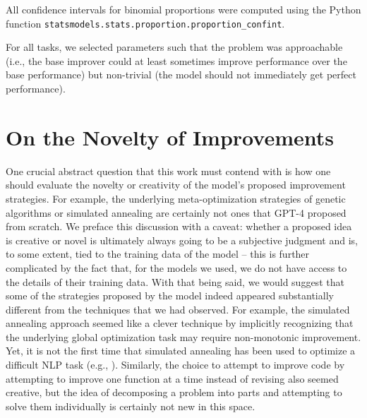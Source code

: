 \documentclass{article}
\begin{document}
All \citet{wilson1927probable} confidence intervals for binomial proportions were computed using the Python function \lstinline[language=Python]{statsmodels.stats.proportion.proportion_confint}.

For all tasks, we selected parameters such that the problem was approachable (i.e., the base improver could at least sometimes improve performance over the base performance) but non-trivial (the model should not immediately get perfect performance).

\section{On the Novelty of Improvements}
One crucial abstract question that this work must contend with is how one should evaluate the novelty or creativity of the model's proposed improvement strategies. For example, the underlying meta-optimization strategies of genetic algorithms or simulated annealing are certainly not ones that GPT-4 proposed from scratch. We preface this discussion with a caveat: whether a proposed idea is creative or novel is ultimately always going to be a subjective judgment and is, to some extent, tied to the training data of the model -- this is further complicated by the fact that, for the models we used, we do not have access to the details of their training data. With that being said, we would suggest that some of the strategies proposed by the model indeed appeared substantially different from the techniques that we had observed. For example, the simulated annealing approach seemed like a clever technique by implicitly recognizing that the underlying global optimization task may require non-monotonic improvement. Yet, it is not the first time that simulated annealing has been used to optimize a difficult NLP task (e.g., \citet{liu-etal-2020-unsupervised}). Similarly, the choice to attempt to improve code by attempting to improve one function at a time instead of revising also seemed creative, but the idea of decomposing a problem into parts and attempting to solve them individually is certainly not new in this space.
\end{document}
